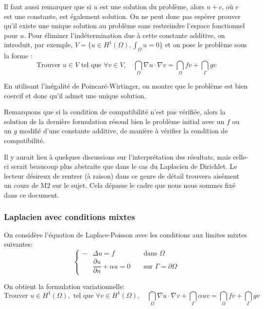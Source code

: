 \medskip
Il faut aussi remarquer que si $u$ est une solution du problème, alors $u+c$,
où $c$ est une constante, est également solution.
On ne peut donc pas espérer prouver qu'il existe une unique solution
au problème sans restreindre l'espace fonctionnel pour $u$.
Pour éliminer l'indétermination due à cette constante additive, on introduit, par exemple, $V = \{u\in H^1(\Omega), \int_\Omega u=0\}$
et on pose le problème sous la forme :
\begin{equation}
\text{Trouver }u\in V \text{ tel que }
\forall v\in V,\quad \dint_\Omega \nabla u\cdot\nabla v  =  \dint_\Omega fv + \dint_\Gamma gv
\end{equation}

En utilisant l'inégalité de Poincaré-Wirtinger, on montre que le problème est bien
coercif et donc qu'il admet une unique solution.

\medskip
Remarquons que si la condition de compatibilité n'est pas vérifiée,
alors la solution de la dernière formulation résoud bien le problème initial avec
un $f$ ou un $g$ modifié d'une constante additive, de manière à vérifier
la condition de compatibilité.

\medskip
Il y aurait lieu à quelques discussions sur l'interprétation des résultats,
mais celle-ci serait beaucoup plus abstraite que dans le cas du Laplacien de Dirichlet.
Le lecteur désireux de rentrer (à raison) dans ce genre de détail trouvera
aisément un cours de M2 sur le sujet.
Cela dépasse le cadre que nous nous sommes fixé dans ce document.

\medskip
\subsubsection{Laplacien avec conditions mixtes}
On considère l'équation de Laplace-Poisson avec les conditions aux limites mixtes suivantes:
\begin{equation}\left\{\begin{aligned}
-&\Delta u=f &&\text{ dans } \Omega\\
&\dfrac{\partial u}{\partial n}+\alpha u=0 &&\text{ sur } \Gamma=\partial\Omega
\end{aligned}
\right.
\end{equation}

\medskip
On obtient la formulation variationnelle:
\begin{equation}
\text{Trouver }u\in H^1(\Omega),  \text{ tel que }
\forall v\in H^1(\Omega),\quad \dint_\Omega \nabla u\cdot\nabla v +\dint_\Gamma \alpha u v =  \dint_\Omega fv + \dint_\Gamma gv
\end{equation}

